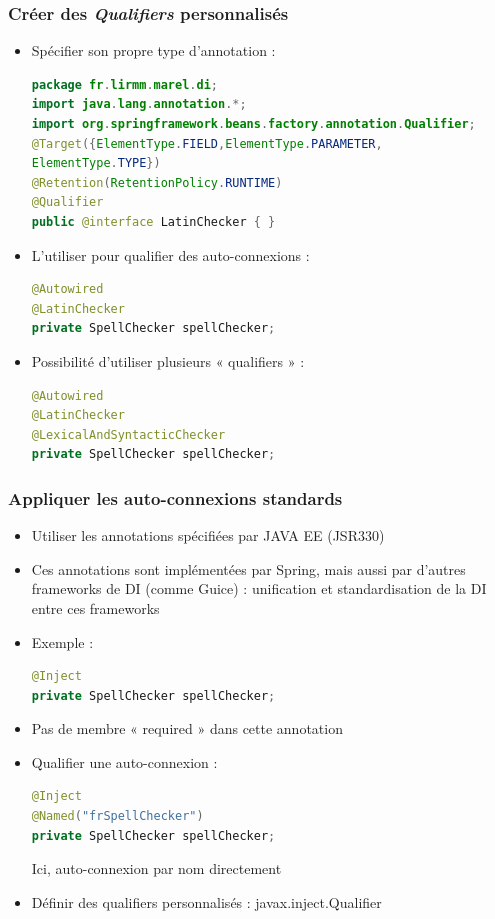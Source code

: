 \documentclass{beamer}
\begin{document}
\begin{frame}[fragile]
  \frametitle{Créer des \textit{Qualifiers} personnalisés}
  \begin{itemize}
\item Spécifier son propre type d'annotation :
\begin{lstlisting}[language=Java,basicstyle=\tiny]        
package fr.lirmm.marel.di;
import java.lang.annotation.*;
import org.springframework.beans.factory.annotation.Qualifier;
@Target({ElementType.FIELD,ElementType.PARAMETER,
ElementType.TYPE})
@Retention(RetentionPolicy.RUNTIME)
@Qualifier
public @interface LatinChecker { }
\end{lstlisting}
\item L'utiliser pour qualifier des auto-connexions :
\begin{lstlisting}[language=Java,basicstyle=\scriptsize]          
@Autowired
@LatinChecker
private SpellChecker spellChecker;
\end{lstlisting}
\item Possibilité d'utiliser plusieurs « qualifiers » :
\begin{lstlisting}[language=Java,basicstyle=\scriptsize]            
@Autowired
@LatinChecker
@LexicalAndSyntacticChecker
private SpellChecker spellChecker;
\end{lstlisting}

\end{itemize}
\end{frame}

\begin{frame}[fragile]
  \frametitle{Appliquer les auto-connexions standards}
  \begin{itemize}
\item Utiliser les annotations spécifiées par JAVA EE (JSR330)
\item Ces annotations sont implémentées par Spring, mais aussi
par d'autres frameworks de DI (comme Guice) : unification
et standardisation de la DI entre ces frameworks
\item Exemple :
\begin{lstlisting}[language=Java,basicstyle=\scriptsize]        
@Inject
private SpellChecker spellChecker;
\end{lstlisting}
\item Pas de membre « required » dans cette annotation
\item Qualifier une auto-connexion :
\begin{lstlisting}[language=Java,basicstyle=\scriptsize]          
@Inject
@Named("frSpellChecker")
private SpellChecker spellChecker;
\end{lstlisting}
Ici, auto-connexion par nom directement
\item Définir des qualifiers personnalisés :
  javax.inject.Qualifier
\end{itemize}
\end{frame}
\end{document}
